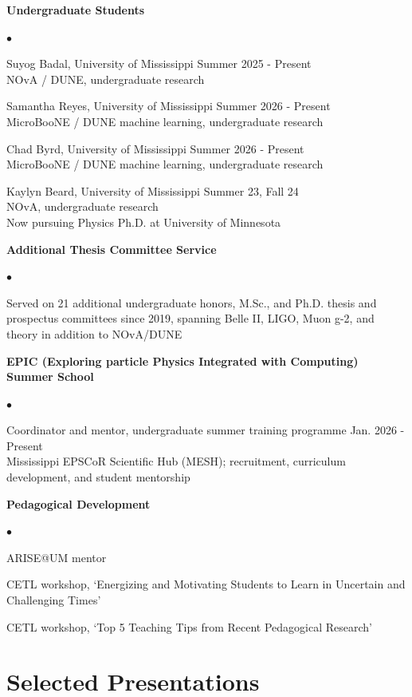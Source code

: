 \documentclass[margin, line]{res}
\newenvironment{list2}{
	\begin{list}{$\bullet$}{%
		\setlength{\itemsep}{0in}
		\setlength{\parsep}{0in} \setlength{\parskip}{0in}
		\setlength{\topsep}{0in} \setlength{\partopsep}{0in}
		\setlength{\leftmargin}{0.2in}}}{\end{list}}
\renewcommand{\em}{\upshape\sffamily}
\begin{document}
\begin{resume}
{\bf Undergraduate Students}
\begin{list2}
	\item Suyog Badal, University of Mississippi \hfill{Summer 2025 - Present}\\
	{\em NOvA / DUNE, undergraduate research}
	\item Samantha Reyes, University of Mississippi \hfill{Summer 2026 - Present}\\
	{\em MicroBooNE / DUNE machine learning, undergraduate research}
	\item Chad Byrd, University of Mississippi \hfill{Summer 2026 - Present}\\
	{\em MicroBooNE / DUNE machine learning, undergraduate research}
	\item Kaylyn Beard, University of Mississippi \hfill{Summer 23, Fall 24}\\
	{\em NOvA, undergraduate research}\\
	Now pursuing Physics Ph.D. at University of Minnesota
\end{list2}

{\bf Additional Thesis Committee Service}
\begin{list2}
	\item Served on 21 additional undergraduate honors, M.Sc., and Ph.D. thesis and prospectus committees since 2019, spanning Belle II, LIGO, Muon g-2, and theory in addition to NOvA/DUNE
\end{list2}

{\bf EPIC (Exploring particle Physics Integrated with Computing) Summer School}
\begin{list2}
	\item Coordinator and mentor, undergraduate summer training programme \hfill{Jan. 2026 - Present}\\
	{\em Mississippi EPSCoR Scientific Hub (MESH); recruitment, curriculum development, and student mentorship}
\end{list2}

{\bf Pedagogical Development}
\begin{list2}
	\item ARISE@UM mentor
	\item CETL workshop, `Energizing and Motivating Students to Learn in Uncertain and Challenging Times'
	\item CETL workshop, `Top 5 Teaching Tips from Recent Pedagogical Research'
\end{list2}


\section{\sc Selected Presentations}


\end{resume}
\end{document}
